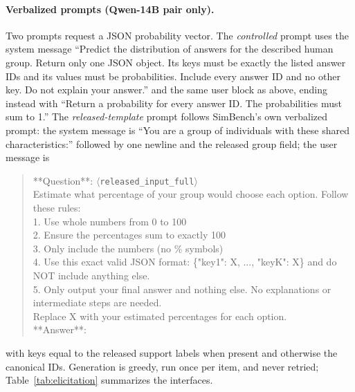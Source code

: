 \documentclass[11pt]{article}
\begin{document}
\paragraph{Verbalized prompts (Qwen-14B pair only).}
Two prompts request a JSON probability vector. The \emph{controlled} prompt
uses the system message ``Predict the distribution of answers for the
described human group. Return only one JSON object. Its keys must be exactly
the listed answer IDs and its values must be probabilities. Include every
answer ID and no other key. Do not explain your answer.'' and the same user
block as above, ending instead with ``Return a probability for every answer
ID. The probabilities must sum to 1.'' The \emph{released-template} prompt
follows SimBench's own verbalized prompt: the system message is ``You are a
group of individuals with these shared characteristics:'' followed by one
newline and the released group field; the user message is
\begin{quote}\small\ttfamily
**Question**: $\langle$\textnormal{\texttt{released\_input\_full}}$\rangle$\\[.4ex]
Estimate what percentage of your group would choose each option. Follow these rules:\\
1. Use whole numbers from 0 to 100\\
2. Ensure the percentages sum to exactly 100\\
3. Only include the numbers (no \% symbols)\\
4. Use this exact valid JSON format: \{"key1": X, ..., "keyK": X\} and do NOT include anything else.\\
5. Only output your final answer and nothing else. No explanations or intermediate steps are needed.\\
Replace X with your estimated percentages for each option.\\
**Answer**:
\end{quote}
with keys equal to the released support labels when present and otherwise the
canonical IDs. Generation is greedy, run once per item, and never retried;
Table~\ref{tab:elicitation} summarizes the interfaces.
\end{document}
